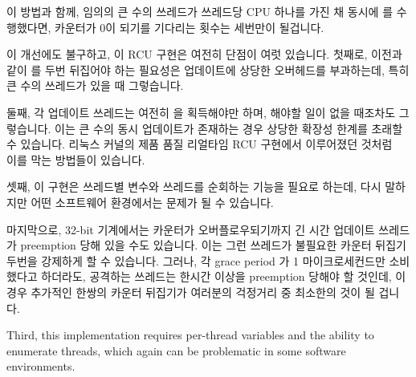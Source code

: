 \fi

이 방법과 함께, 임의의 큰 수의 쓰레드가 쓰레드당 CPU 하나를 가진 채 동시에
 를 수행했다면, 카운터가 0이 되기를 기다리는 횟수는
세번만이 될겁니다.

이 개선에도 불구하고, 이 RCU 구현은 여전히 단점이 여럿 있습니다.
첫째로, 이전과 같이  를 두번 뒤집어야 하는 필요성은 업데이트에
상당한 오버헤드를 부과하는데, 특히 큰 수의 쓰레드가 있을 때 그렇습니다.

둘째, 각 업데이트 쓰레드는 여전히  을 획득해야만 하며, 해야할
일이 없을 때조차도 그렇습니다.
이는 큰 수의 동시 업데이트가 존재하는 경우 상당한 확장성 한계를 초래할 수
있습니다.
리눅스 커널의 제품 품질 리얼타임 RCU 구현에서 이루어졌던
것처럼~\cite{PaulEMcKenney2007PreemptibleRCU} 이를 막는 방법들이 있습니다.

\iffalse

With this approach, if an arbitrarily large number of threads invoke
\co{synchronize_rcu()} concurrently, with one CPU for each thread, there
will be a total of only three waits for counters to go to zero.

Despite the improvements, this implementation of RCU still
has a few shortcomings.
First, as before, the need to flip \co{rcu_idx} twice imposes substantial
overhead on updates, especially if there are large
numbers of threads.

Second, each updater still acquires \co{rcu_gp_lock}, even if there
is no work to be done.
This can result in a severe scalability limitation
if there are large numbers of concurrent updates.
There are ways of avoiding this, as was done in a
production-quality real-time implementation of RCU for the Linux
kernel~\cite{PaulEMcKenney2007PreemptibleRCU}.

\fi

셋째, 이 구현은 쓰레드별 변수와 쓰레드를 순회하는 기능을 필요로 하는데, 다시
말하지만 어떤 소프트웨어 환경에서는 문제가 될 수 있습니다.

마지막으로, 32-bit 기계에서는  카운터가 오버플로우되기까지 긴 시간
업데이트 쓰레드가 preemption 당해 있을 수도 있습니다.
이는 그런 쓰레드가 불필요한 카운터 뒤집기 두번을 강제하게 할 수 있습니다.
그러나, 각 grace period 가 1 마이크로세컨드만 소비했다고 하더라도, 공격하는
쓰레드는 한시간 이상을 preemption 당해야 할 것인데, 이 경우 추가적인 한쌍의
카운터 뒤집기가 여러분의 걱정거리 중 최소한의 것이 될 겁니다.

\iffalse

Third, this implementation requires per-thread variables
and the ability to enumerate threads, which again can be
problematic in some software environments.

